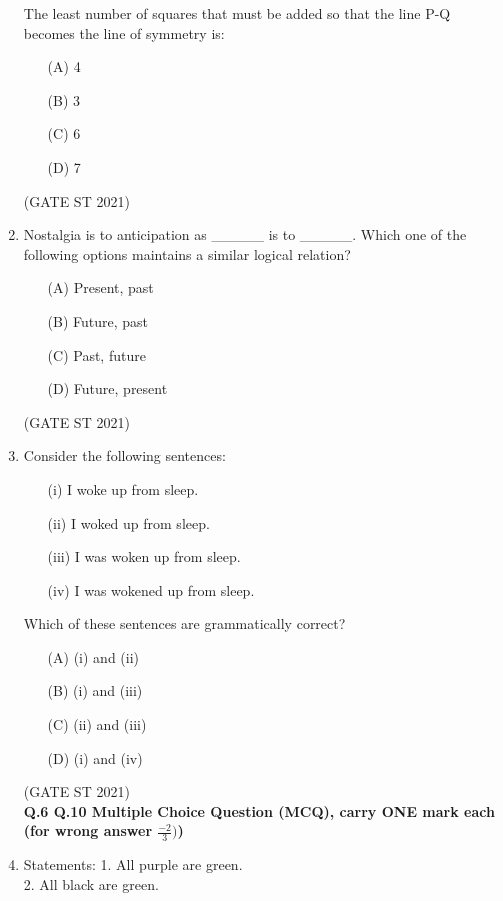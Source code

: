 \documentclass[journal,12pt,onecolumn]{IEEEtran}
\theoremstyle{remark}
\begin{document}
\begin{enumerate}
The least number of squares that must be added so that the line P-Q becomes the line of symmetry is:

\begin{enumerate}
\item[(A)] 4
\item[(B)] 3
\item[(C)] 6
\item[(D)] 7
\end{enumerate}

\hfill (GATE ST 2021) \\

\item
Nostalgia is to anticipation as \_\_\_\_\_ is to \_\_\_\_\_.  
Which one of the following options maintains a similar logical relation?

\begin{enumerate}
\item[(A)] Present, past
\item[(B)] Future, past
\item[(C)] Past, future
\item[(D)] Future, present
\end{enumerate}
\hfill (GATE ST 2021)



\item
Consider the following sentences:
\begin{enumerate}
\item[(i)] I woke up from sleep.
\item[(ii)] I woked up from sleep.
\item[(iii)] I was woken up from sleep.
\item[(iv)] I was wokened up from sleep.
\end{enumerate}
Which of these sentences are grammatically correct?
\begin{enumerate}
\item[(A)] (i) and (ii)
\item[(B)] (i) and (iii)
\item[(C)] (ii) and (iii)
\item[(D)] (i) and (iv)
\end{enumerate}
\hfill (GATE ST 2021)\\


\textbf{Q.6 \text{-} Q.10 Multiple Choice Question (MCQ), carry ONE mark each (for wrong answer $\frac{-2}{3})$)}

\item
Statements:  
1. All purple are green. \\ 
2. All black are green.  


\end{enumerate}
\end{document}
